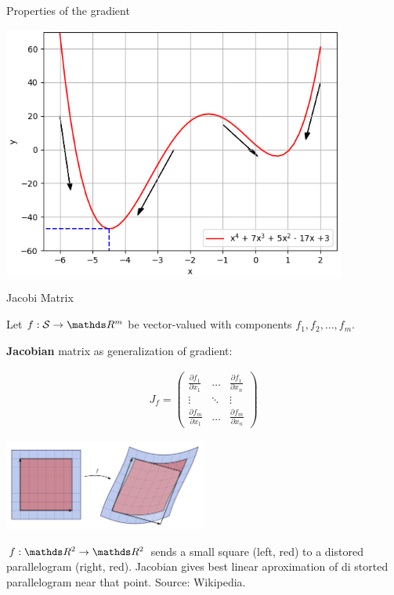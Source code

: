 \begin{vbframe}{Properties of the gradient}
\begin{center}
\includegraphics[width=0.85\textwidth]{figure_man/negative_gradients.png}\\
\end{center}



\end{vbframe}




\begin{vbframe}{Jacobi Matrix}

Let $f: \mathcal{S} \to \R^m$ be vector-valued with components $f_1, f_2, ..., f_m$. 

\textbf{Jacobian} matrix as generalization of gradient:  

\begin{eqnarray*}
	J_f = \begin{pmatrix} \frac{\partial f_1}{\partial x_1} & \hdots & \frac{\partial f_1}{\partial x_n} \\
	\vdots & \ddots & \vdots \\
	\frac{\partial f_m}{\partial x_1} & \hdots & \frac{\partial f_m}{\partial x_n}
	\end{pmatrix}
\end{eqnarray*}

\begin{center}
	\includegraphics[width = 0.5\textwidth]{figure_man/Jacobian.png} \\
	\begin{footnotesize}
	$f: \R^2 \to \R^2$ sends  a small square (left, red) to a distored parallelogram (right, red). Jacobian gives best linear aproximation of di
	storted parallelogram near that point. Source: Wikipedia.
	\end{footnotesize}
\end{center}


\end{vbframe}

\endlecture
